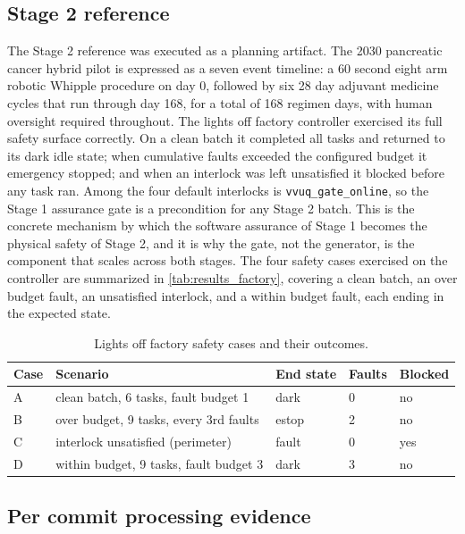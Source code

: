 \subsection{Stage 2 reference}

The Stage 2 reference was executed as a planning artifact. The 2030 pancreatic
cancer hybrid pilot is expressed as a seven event timeline: a 60 second eight arm
robotic Whipple procedure on day 0, followed by six 28 day adjuvant medicine
cycles that run through day 168, for a total of 168 regimen days, with human
oversight required throughout. The lights off factory controller exercised its
full safety surface correctly. On a clean batch it completed all tasks and
returned to its dark idle state; when cumulative faults exceeded the configured
budget it emergency stopped; and when an interlock was left unsatisfied it blocked
before any task ran. Among the four default interlocks is
\texttt{vvuq\_gate\_online}, so the Stage 1 assurance gate is a precondition for
any Stage 2 batch. This is the concrete mechanism by which the software assurance
of Stage 1 becomes the physical safety of Stage 2, and it is why the gate, not
the generator, is the component that scales across both stages. The four safety
cases exercised on the controller are summarized in
\autoref{tab:results_factory}, covering a clean batch, an over budget fault, an
unsatisfied interlock, and a within budget fault, each ending in the expected
state.

\begin{table}[H]
\caption{Lights off factory safety cases and their outcomes.}
\label{tab:results_factory}
\centering
\begin{tabularx}{\textwidth}{C{1.0cm} L{6.0cm} C{1.9cm} C{1.5cm} >{\raggedright\arraybackslash}X}
\toprule
\textbf{Case} & \textbf{Scenario} & \textbf{End state} & \textbf{Faults} & \textbf{Blocked} \\
\midrule
  A & clean batch, 6 tasks, fault budget 1 & dark & 0 & no \\
  B & over budget, 9 tasks, every 3rd faults & estop & 2 & no \\
  C & interlock unsatisfied (perimeter) & fault & 0 & yes \\
  D & within budget, 9 tasks, fault budget 3 & dark & 3 & no \\
\bottomrule
\end{tabularx}
\end{table}

\subsection{Per commit processing evidence}

